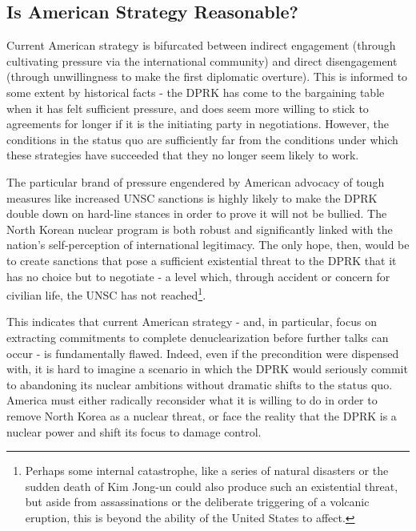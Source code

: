 \subsection{Is American Strategy Reasonable?}

Current American strategy is bifurcated between indirect engagement (through cultivating pressure via the international community) and direct disengagement (through unwillingness to make the first diplomatic overture). This is informed to some extent by historical facts - the DPRK has come to the bargaining table when it has felt sufficient pressure, and does seem more willing to stick to agreements for longer if it is the initiating party in negotiations. However, the conditions in the status quo are sufficiently far from the conditions under which these strategies have succeeded that they no longer seem likely to work.

The particular brand of pressure engendered by American advocacy of tough measures like increased UNSC sanctions is highly likely to make the DPRK double down on hard-line stances in order to prove it will not be bullied. The North Korean nuclear program is both robust and significantly linked with the nation's self-perception of international legitimacy. The only hope, then, would be to create sanctions that pose a sufficient existential threat to the DPRK that it has no choice but to negotiate - a level which, through accident or concern for civilian life, the UNSC has not reached\footnote{Perhaps some internal catastrophe, like a series of natural disasters or the sudden death of Kim Jong-un could also produce such an existential threat, but aside from assassinations or the deliberate triggering of a volcanic eruption, this is beyond the ability of the United States to affect.}. 

This indicates that current American strategy - and, in particular, focus on extracting commitments to complete denuclearization before further talks can occur - is fundamentally flawed. Indeed, even if the precondition were dispensed with, it is hard to imagine a scenario in which the DPRK would seriously commit to abandoning its nuclear ambitions without dramatic shifts to the status quo. America must either radically reconsider what it is willing to do in order to remove North Korea as a nuclear threat, or face the reality that the DPRK is a nuclear power and shift its focus to damage control.